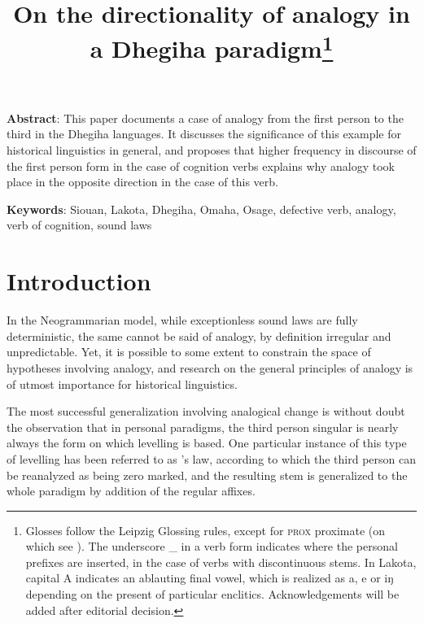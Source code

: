 \documentclass[oneside,a4paper,11pt]{article}
\newcommand{\ipa}[1]{{\phon#1}} %
\begin{document}
 

\title{On the directionality of analogy in a Dhegiha paradigm\footnote{Glosses follow the Leipzig Glossing rules, except for \textsc{prox} proximate (on which see \citealt{eschenberg05omaha}). The underscore \_ in a verb form indicates where the personal prefixes are inserted, in the case of verbs with discontinuous stems. In Lakota, capital \ipa{A} indicates an ablauting final vowel, which is realized as \ipa{a}, \ipa{e} or \ipa{iŋ} depending on the present of particular enclitics. Acknowledgements will be added after editorial decision.}}
\maketitle
 \onehalfspacing
\textbf{Abstract}: This paper documents a case of analogy from the first person to the third in the Dhegiha languages. It discusses the significance of this example for historical linguistics in general, and proposes that higher frequency in discourse of the first person form in the case of cognition verbs explains why analogy took place in the opposite direction in the case of this verb.

\textbf{Keywords}: Siouan, Lakota, Dhegiha, Omaha, Osage, defective verb, analogy, verb of cognition, sound laws
 
\section{Introduction}

In the Neogrammarian model, while exceptionless sound laws are fully deterministic, the same cannot be said of analogy, by definition irregular and unpredictable. Yet, it is possible to some extent to constrain  the space of hypotheses involving analogy, and research on the general principles of analogy is of utmost importance for historical linguistics.

The most successful generalization involving analogical change is without doubt the observation that in personal paradigms, the third person singular is nearly always the form on which levelling is based. One particular instance of this type of levelling has been referred to as  \citet{watkins62celtic}'s law, according to which the third person can be reanalyzed as being zero marked, and the resulting stem is generalized to the whole paradigm by addition of the regular affixes. 
\end{document}
